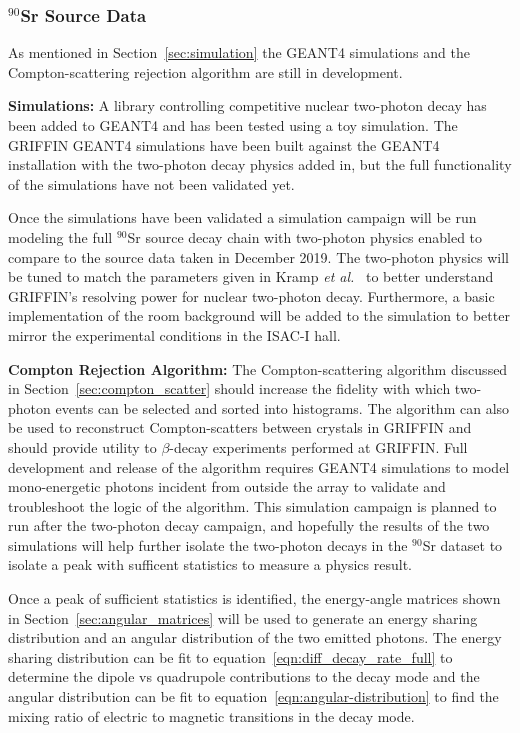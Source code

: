 \documentclass[cnatzke_thesis_proposal.tex]{subfiles}
\begin{document}
\subsubsection{$^{90}$Sr Source Data}
As mentioned in Section~\ref{sec:simulation} the GEANT4 simulations and the Compton-scattering rejection algorithm are still in development. 

\textbf{Simulations:} A library controlling competitive nuclear two-photon decay has been added to GEANT4 and has been tested using a toy simulation.
The GRIFFIN GEANT4 simulations have been built against the GEANT4 installation with the two-photon decay physics added in, but the full functionality of the simulations have not been validated yet.

Once the simulations have been validated a simulation campaign will be run modeling the full $^{90}$Sr source decay chain with two-photon physics enabled to compare to the source data taken in December 2019. 
The two-photon physics will be tuned to match the parameters given in Kramp \textit{et al.}~\cite{kramp_nuclear_1987} to better understand GRIFFIN's resolving power for nuclear two-photon decay. 
Furthermore, a basic implementation of the room background will be added to the simulation to better mirror the experimental conditions in the ISAC-I hall. 

\textbf{Compton Rejection Algorithm:} The Compton-scattering algorithm discussed in Section~\ref{sec:compton_scatter} should increase the fidelity with which two-photon events can be selected and sorted into histograms. 
The algorithm can also be used to reconstruct Compton-scatters between crystals in GRIFFIN and should provide utility to $\beta$-decay experiments performed at GRIFFIN. 
Full development and release of the algorithm requires GEANT4 simulations to model mono-energetic photons incident from outside the array to validate and troubleshoot the logic of the algorithm.
This simulation campaign is planned to run after the two-photon decay campaign, and hopefully the results of the two simulations will help further isolate the two-photon decays in the $^{90}$Sr dataset to isolate a peak with sufficent statistics to measure a physics result. 

Once a peak of sufficient statistics is identified, the energy-angle matrices shown in Section~\ref{sec:angular_matrices} will be used to generate an energy sharing distribution and an angular distribution of the two emitted photons.
The energy sharing distribution can be fit to equation~\ref{eqn:diff_decay_rate_full} to determine the dipole vs quadrupole contributions to the decay mode and the angular distribution can be fit to equation~\ref{eqn:angular-distribution} to find the mixing ratio of electric to magnetic transitions in the decay mode. 
\end{document}
